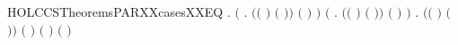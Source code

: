 \newcommand{\HOLCCSTheoremsPARXXcases}{\UseVerbatim{HOLCCSTheoremsPARXXcases}}
\begin{SaveVerbatim}{HOLCCSTheoremsPARXXcasesXXEQ}
\HOLTokenTurnstile{} \HOLSymConst{\HOLTokenForall{}}   .
        \HOLSymConst{\ensuremath{\mid}}  \HOLTokenTransBegin{}\HOLTokenTransEnd {} \HOLSymConst{\HOLTokenEquiv{}}
       \ensuremath{(}\HOLSymConst{\HOLTokenExists{}}  .
            \ensuremath{(}\ensuremath{(} \HOLSymConst{\ensuremath{=}} \ensuremath{)} \HOLSymConst{\HOLTokenConj{}} \ensuremath{(} \HOLSymConst{\ensuremath{=}} \ensuremath{)}\ensuremath{)} \HOLSymConst{\HOLTokenConj{}} \ensuremath{(} \HOLSymConst{\ensuremath{=}}  \HOLSymConst{\ensuremath{\mid}} \ensuremath{)} \HOLSymConst{\HOLTokenConj{}}  \HOLTokenTransBegin{}\HOLTokenTransEnd {}\ensuremath{)} \HOLSymConst{\HOLTokenDisj{}}
       \ensuremath{(}\HOLSymConst{\HOLTokenExists{}}  .
            \ensuremath{(}\ensuremath{(} \HOLSymConst{\ensuremath{=}} \ensuremath{)} \HOLSymConst{\HOLTokenConj{}} \ensuremath{(} \HOLSymConst{\ensuremath{=}} \ensuremath{)}\ensuremath{)} \HOLSymConst{\HOLTokenConj{}} \ensuremath{(} \HOLSymConst{\ensuremath{=}}  \HOLSymConst{\ensuremath{\mid}} \ensuremath{)} \HOLSymConst{\HOLTokenConj{}}  \HOLTokenTransBegin{}\HOLTokenTransEnd {}\ensuremath{)} \HOLSymConst{\HOLTokenDisj{}}
       \HOLSymConst{\HOLTokenExists{}}    .
           \ensuremath{(}\ensuremath{(} \HOLSymConst{\ensuremath{=}} \ensuremath{)} \HOLSymConst{\HOLTokenConj{}} \ensuremath{(} \HOLSymConst{\ensuremath{=}} \ensuremath{)}\ensuremath{)} \HOLSymConst{\HOLTokenConj{}} \ensuremath{(} \HOLSymConst{\ensuremath{=}} \HOLConst{\ensuremath{\tau}}\ensuremath{)} \HOLSymConst{\HOLTokenConj{}} \ensuremath{(} \HOLSymConst{\ensuremath{=}}  \HOLSymConst{\ensuremath{\mid}} \ensuremath{)} \HOLSymConst{\HOLTokenConj{}}
            \HOLTokenTransBegin{} \HOLTokenTransEnd {} \HOLSymConst{\HOLTokenConj{}}  \HOLTokenTransBegin{} \ensuremath{(} \ensuremath{)}\HOLTokenTransEnd {}
\end{SaveVerbatim}
